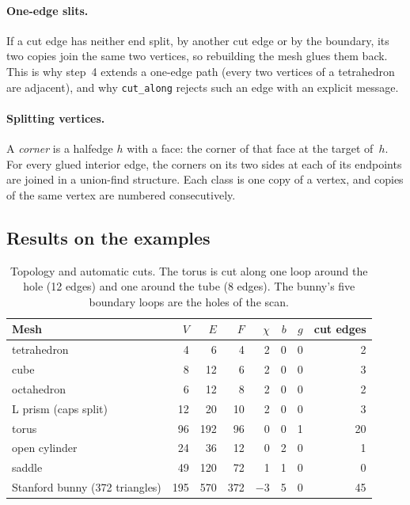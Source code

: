 \documentclass[11pt]{article}
\theoremstyle{definition}
\begin{document}
\paragraph{One-edge slits.} If a cut edge has neither end split, by another cut
edge or by the boundary, its two copies join the same two vertices, so
rebuilding the mesh glues them back. This is why step~4 extends a one-edge path
(every two vertices of a tetrahedron are adjacent), and why
\texttt{cut\_along} rejects such an edge with an explicit message.

\paragraph{Splitting vertices.} A \emph{corner} is a halfedge $h$ with a face:
the corner of that face at the target of~$h$. For every glued interior edge,
the corners on its two sides at each of its endpoints are joined in a
union-find structure. Each class is one copy of a vertex, and copies of the
same vertex are numbered consecutively.

\subsection{Results on the examples}

\begin{table}[ht]
\centering
\small
\begin{tabular}{@{}lrrrrrrr@{}}
\toprule
Mesh & $V$ & $E$ & $F$ & $\chi$ & $b$ & $g$ & cut edges \\
\midrule
tetrahedron & 4 & 6 & 4 & 2 & 0 & 0 & 2 \\
cube & 8 & 12 & 6 & 2 & 0 & 0 & 3 \\
octahedron & 6 & 12 & 8 & 2 & 0 & 0 & 2 \\
L prism (caps split) & 12 & 20 & 10 & 2 & 0 & 0 & 3 \\
torus & 96 & 192 & 96 & 0 & 0 & 1 & 20 \\
open cylinder & 24 & 36 & 12 & 0 & 2 & 0 & 1 \\
saddle & 49 & 120 & 72 & 1 & 1 & 0 & 0 \\
Stanford bunny (372 triangles) & 195 & 570 & 372 & $-3$ & 5 & 0 & 45 \\
\bottomrule
\end{tabular}
\caption{Topology and automatic cuts. The torus is cut along one loop around the
hole (12 edges) and one around the tube (8 edges). The bunny's five boundary
loops are the holes of the scan.}
\end{table}
\end{document}
